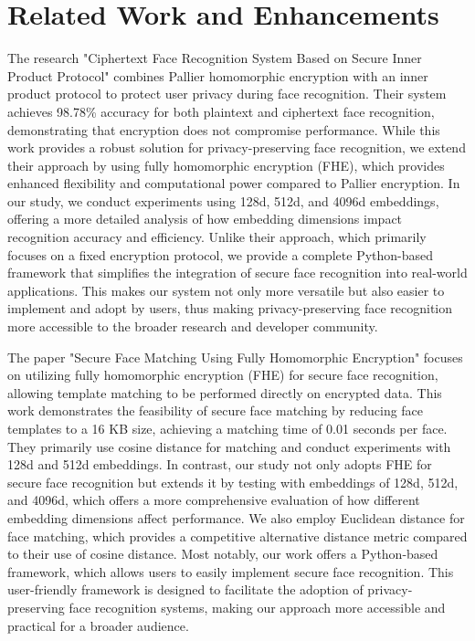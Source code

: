 \section{Related Work and Enhancements}
The research "Ciphertext Face Recognition System Based on Secure Inner Product Protocol" \cite{related2} combines Pallier homomorphic encryption with an inner product protocol to protect user privacy during face recognition. Their system achieves 98.78\% accuracy for both plaintext and ciphertext face recognition, demonstrating that encryption does not compromise performance. While this work provides a robust solution for privacy-preserving face recognition, we extend their approach by using fully homomorphic encryption (FHE), which provides enhanced flexibility and computational power compared to Pallier encryption. In our study, we conduct experiments using 128d, 512d, and 4096d embeddings, offering a more detailed analysis of how embedding dimensions impact recognition accuracy and efficiency. Unlike their approach, which primarily focuses on a fixed encryption protocol, we provide a complete Python-based framework that simplifies the integration of secure face recognition into real-world applications. This makes our system not only more versatile but also easier to implement and adopt by users, thus making privacy-preserving face recognition more accessible to the broader research and developer community.

The paper "Secure Face Matching Using Fully Homomorphic Encryption" \cite{related1} focuses on utilizing fully homomorphic encryption (FHE) for secure face recognition, allowing template matching to be performed directly on encrypted data. This work demonstrates the feasibility of secure face matching by reducing face templates to a 16 KB size, achieving a matching time of 0.01 seconds per face. They primarily use cosine distance for matching and conduct experiments with 128d and 512d embeddings. In contrast, our study not only adopts FHE for secure face recognition but extends it by testing with embeddings of 128d, 512d, and 4096d, which offers a more comprehensive evaluation of how different embedding dimensions affect performance. We also employ Euclidean distance for face matching, which provides a competitive alternative distance metric compared to their use of cosine distance. Most notably, our work offers a Python-based framework, which allows users to easily implement secure face recognition. This user-friendly framework is designed to facilitate the adoption of privacy-preserving face recognition systems, making our approach more accessible and practical for a broader audience.